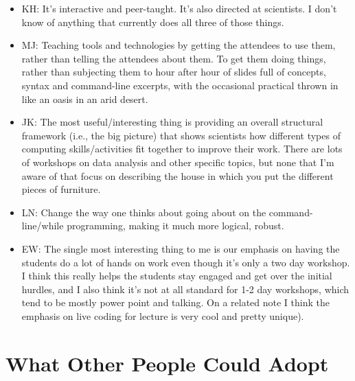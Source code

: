 \documentclass{article}
\begin{document}
\begin{itemize}

  \item KH: It's interactive and peer-taught. It's also directed at scientists. I don't know of anything that currently does all three of those things.

  \item MJ: Teaching tools and technologies by getting the attendees to use them, rather than telling the attendees about them. To get them doing things, rather than subjecting them to hour after hour of slides full of concepts, syntax and command-line excerpts, with the occasional practical thrown in like an oasis in an arid desert.

  \item JK: The most useful/interesting thing is providing an overall structural framework (i.e., the big picture) that shows scientists how different types of computing skills/activities fit together to improve their work. There are lots of workshops on data analysis and other specific topics, but none that I'm aware of that focus on describing the house in which you put the different pieces of furniture.

  \item LN: Change the way one thinks about going about on the command-line/while programming, making it much more logical, robust.

  \item EW: The single most interesting thing to me is our emphasis on having the students do a lot of hands on work even though it's only a two day workshop. I think this really helps the students stay engaged and get over the initial hurdles, and I also think it's not at all standard for 1-2 day workshops, which tend to be mostly power point and talking. On a related note I think the emphasis on live coding for lecture is very cool and pretty unique).

\end{itemize}

\section{What Other People Could Adopt}
\end{document}
